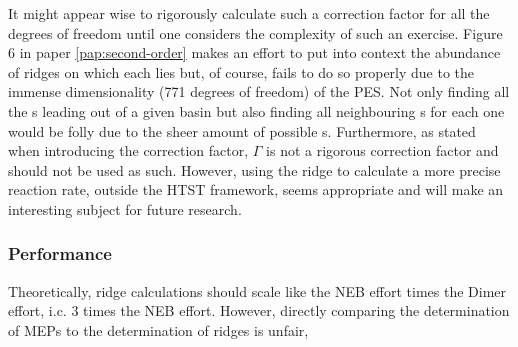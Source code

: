 It might appear wise to rigorously calculate such a correction factor for all the degrees of freedom until one considers the complexity of such an exercise.
Figure 6 in paper \ref{pap:second-order} makes an effort to put into context the abundance of ridges on which each  lies but, of course, fails to do so properly due to the immense dimensionality (771 degrees of freedom) of the PES.
Not only finding all the s leading out of a given basin but also finding all neighbouring s for each one would be folly due to the sheer amount of possible \sap{}s.
Furthermore, as stated when introducing the correction factor, $\Gamma$ is not a rigorous correction factor and should not be used as such.
However, using the ridge to calculate a more precise reaction rate, outside the HTST framework, seems appropriate and will make an interesting subject for future research.

\subsubsection{Performance}
Theoretically, ridge calculations should scale like the NEB effort times the Dimer effort, i.c. 3 times the NEB effort.
However, directly comparing the determination of MEPs to the determination of ridges is unfair, \expand

